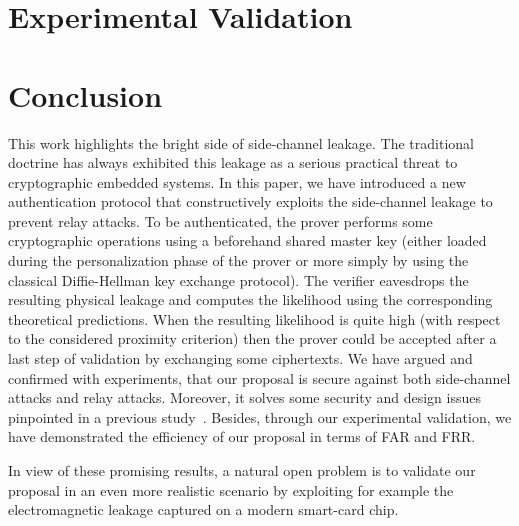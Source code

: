 \documentclass{llncs}
\begin{document}
\section{Experimental Validation}\label{sec:simu}


\section{Conclusion}\label{sec:conc}
This work highlights the bright side of side-channel leakage. The traditional doctrine has always exhibited this leakage as a serious practical threat to cryptographic embedded systems. In this paper, we have introduced a new authentication protocol that constructively exploits the side-channel leakage to prevent relay attacks. To be authenticated, the prover performs some cryptographic operations using a beforehand shared master key (either loaded during the personalization phase of the prover or more simply by using the classical Diffie-Hellman key exchange protocol). The verifier eavesdrops the resulting physical leakage and computes the likelihood using the corresponding theoretical predictions. 
When the resulting likelihood is quite high (with respect to the considered proximity criterion) then the prover could be accepted after a last step of validation by exchanging some ciphertexts.
We have argued and confirmed with experiments, that our proposal is secure against both side-channel attacks and relay attacks. Moreover, it solves some security and design issues pinpointed in a previous study~\cite{SakiyamaMMKHMMN15}. Besides, through our experimental validation, we have demonstrated the efficiency of our proposal in terms of FAR and FRR.
       
In view of these promising results, a natural open problem is to validate our proposal in an even more realistic scenario by exploiting for example the electromagnetic leakage captured on a modern smart-card chip.



\end{document}

